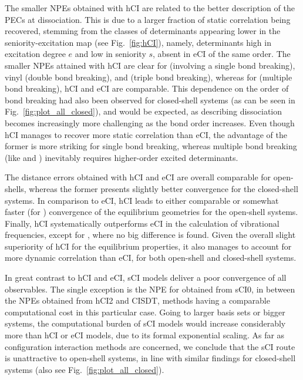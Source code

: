 \documentclass[aip,jcp,reprint,noshowkeys,superscriptaddress]{revtex4-1}
\begin{document}
The smaller NPEs obtained with hCI are related to the better description of the PECs at dissociation.
This is due to a larger fraction of static correlation being recovered,
stemming from the classes of determinants appearing lower in the seniority-excitation map (see Fig.~\ref{fig:hCI}),
namely, determinants high in excitation degree $e$ and low in seniority $s$, absent in eCI of the same order.
The smaller NPEs attained with hCI are clear for  (involving a single bond breaking),
vinyl (double bond breaking), and  (triple bond breaking),
whereas for  (multiple bond breaking), hCI and eCI are comparable.
This dependence on the order of bond breaking had also been observed for closed-shell systems \cite{Kossoski_2022} (as can be seen in Fig.~\ref{fig:plot_all_closed}),
and would be expected, as describing dissociation becomes increasingly more challenging as the bond order increases.
Even though hCI manages to recover more static correlation than eCI,
the advantage of the former is more striking for single bond breaking, whereas multiple bond breaking (like  and ) inevitably requires higher-order excited determinants.

The distance errors obtained with hCI and eCI are overall comparable for open-shells, whereas the former presents slightly better convergence for the closed-shell systems.
In comparison to eCI, hCI leads to either comparable or somewhat faster (for ) convergence of the equilibrium geometries for the open-shell systems.
Finally, hCI systematically outperforms eCI in the calculation of vibrational frequencies, except for , where no big difference is found.
Given the overall slight superiority of hCI for the equilibrium properties, it also manages to account for more dynamic correlation than eCI,
for both open-shell and closed-shell systems.

In great contrast to hCI and eCI, sCI models deliver a poor convergence of all observables.
The single exception is the NPE for  obtained from sCI0, in between the NPEs obtained from hCI2 and CISDT, methods having a comparable computational cost in this particular case.
Going to larger basis sets or bigger systems, the computational burden of sCI models would increase considerably more than hCI or eCI models,
due to its formal exponential scaling.
As far as configuration interaction methods are concerned, we conclude that the sCI route is unattractive to open-shell systems,
in line with similar findings for closed-shell systems \cite{Kossoski_2022} (also see Fig.~\ref{fig:plot_all_closed}).
\end{document}
